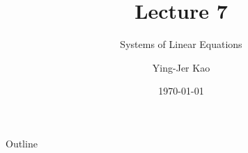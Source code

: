 \documentclass{beamer}
\title[Systems of Linear  Equations] %
{Lecture 7}
\subtitle
{Systems of Linear  Equations} %
\author[Ying-Jer Kao] %
{Ying-Jer Kao}
\institute[National Taiwan University] %
{
  Department of Physics\\
 National Taiwan University
  }
\date[Numerical Analysis and Programming] %
{\today}
\begin{document}
\begin{frame}
  \titlepage
\end{frame}

\begin{frame}{Outline}
  \tableofcontents
\end{frame}



\end{document}
